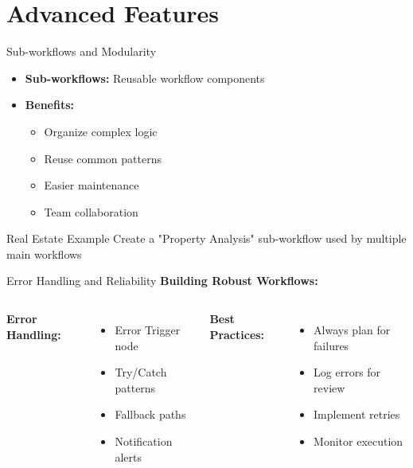 \documentclass{beamer}
\begin{document}
\section{Advanced Features}

\begin{frame}{Sub-workflows and Modularity}
  \begin{itemize}
    \item \textbf{Sub-workflows:} Reusable workflow components
    \item \textbf{Benefits:}
      \begin{itemize}
        \item Organize complex logic
        \item Reuse common patterns
        \item Easier maintenance
        \item Team collaboration
      \end{itemize}
  \end{itemize}
  
  \vspace{0.3cm}
  
  \begin{block}{Real Estate Example}
    Create a "Property Analysis" sub-workflow used by multiple main workflows
  \end{block}
\end{frame}

\begin{frame}{Error Handling and Reliability}
  \textbf{Building Robust Workflows:}
  
  \begin{columns}[onlytextwidth]
      \textbf{Error Handling:}
      \begin{itemize}
        \item Error Trigger node
        \item Try/Catch patterns
        \item Fallback paths
        \item Notification alerts
      \end{itemize}
    
      \textbf{Best Practices:}
      \begin{itemize}
        \item Always plan for failures
        \item Log errors for review
        \item Implement retries
        \item Monitor execution
      \end{itemize}
  \end{columns}
\end{frame}
\end{document}
